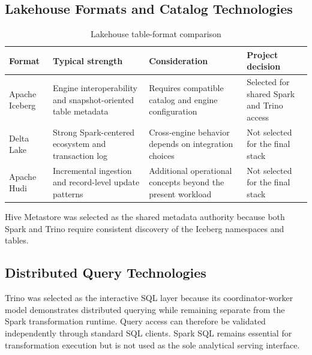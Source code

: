 \subsection{Lakehouse Formats and Catalog Technologies}
\begin{table}[htbp]
    \centering
    \footnotesize
    \begin{tabularx}{\textwidth}{|>{\RaggedRight\arraybackslash}p{}|>{\RaggedRight\arraybackslash}p{}|>{\RaggedRight\arraybackslash}p{}|>{\RaggedRight\arraybackslash}X|}
        \hline
        \rowcolor{ModernTableHeader}
        \color{white}\textbf{Format} & \color{white}\textbf{Typical strength} & \color{white}\textbf{Consideration} & \color{white}\textbf{Project decision} \\
        \hline
        Apache Iceberg & Engine interoperability and snapshot-oriented table metadata & Requires compatible catalog and engine configuration & Selected for shared Spark and Trino access \\
        \hline
        Delta Lake & Strong Spark-centered ecosystem and transaction log & Cross-engine behavior depends on integration choices & Not selected for the final stack \\
        \hline
        Apache Hudi & Incremental ingestion and record-level update patterns & Additional operational concepts beyond the present workload & Not selected for the final stack \\
        \hline
    \end{tabularx}
    \caption{Lakehouse table-format comparison}
    \label{tab:tech-table-format-comparison}
\end{table}
Hive Metastore was selected as the shared metadata authority because both Spark and Trino require consistent discovery of the Iceberg namespaces and tables.

\subsection{Distributed Query Technologies}
Trino was selected as the interactive SQL layer because its coordinator-worker model demonstrates distributed querying while remaining separate from the Spark transformation runtime. Query access can therefore be validated independently through standard SQL clients. Spark SQL remains essential for transformation execution but is not used as the sole analytical serving interface.

